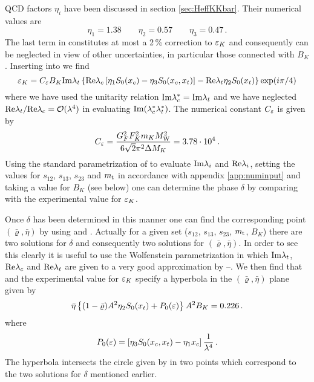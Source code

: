 QCD factors $\eta_i$ have been discussed in section
\ref{sec:HeffKKbar}. Their numerical values are
\begin{equation}
\eta_1 = 1.38 
\qquad
\eta_2 = 0.57
\qquad
\eta_3 = 0.47 \, .
\label{eq:etaknum}
\end{equation}
The last term in  constitutes at
most a 2\,\% correction to $\varepsilon_K$ and consequently can be neglected
in view of other uncertainties, in particular those connected with
$B_K$.  Inserting  into  we find
\begin{equation}
\varepsilon_K = C_{\varepsilon} B_K {\rm Im}\lambda_t \left\{
{\rm Re}\lambda_c \left[ \eta_1 S_0(x_c) - \eta_3 S_0(x_c, x_t) \right] -
{\rm Re}\lambda_t \eta_2 S_0(x_t) \right\} \exp(i \pi/4)
\label{eq:epsformula}
\end{equation}
where we have used the unitarity relation ${\rm Im}\lambda_c^* = {\rm
Im}\lambda_t$ and we have neglected ${\rm Re}\lambda_t/{\rm Re}\lambda_c
= {\cal O}(\lambda^4)$ in evaluating ${\rm Im}(\lambda_c^* \lambda_t^*)$.
The numerical constant $C_\varepsilon$ is given by
\begin{equation}
C_\varepsilon = \frac{G_F^2 F_K^2 m_K M_{\rm W}^2}{6 \sqrt{2} \pi^2 \Delta M_K}
       = 3.78 \cdot 10^4 \, .
\label{eq:Ceps}
\end{equation}
Using the standard parametrization of  to evaluate ${\rm
Im}\lambda_i$ and ${\rm Re}\lambda_i$, setting the values for $s_{12}$,
$s_{13}$, $s_{23}$ and $m_{\rm t}$ in accordance with appendix
\ref{app:numinput} and taking a value for $B_K$ (see below) one can
determine the phase $\delta$ by comparing  with the
experimental value for $\varepsilon_K$.

Once $\delta$ has been determined in this manner one can find the
corresponding point $(\bar\varrho,\bar\eta)$ by using  and
. Actually for a given set ($s_{12}$, $s_{13}$, $s_{23}$,
$m_{\rm t}$, $B_K$) there are two solutions for $\delta$ and consequently two
solutions for $(\bar\varrho,\bar\eta)$. In order to see this clearly it is
useful to use the Wolfenstein parametrization in which ${\rm
Im}\lambda_t$, ${\rm Re}\lambda_c$ and ${\rm Re}\lambda_t$ are given to
a very good approximation by --. We then find that
 and the experimental value for $\varepsilon_K$ specify a
hyperbola in the $(\bar\varrho,\bar\eta)$ plane given by
\begin{equation}
\bar\eta \left\{ (1 - \bar\varrho) A^2 \eta_2 S_0(x_t) + P_0(\varepsilon)
\right\} A^2 B_K = 0.226 \, .
\label{eq:hyperbola}
\end{equation}
where
\begin{equation}
P_0(\varepsilon) =
\left[ \eta_3 S_0(x_c, x_t) - \eta_1 x_c \right] \frac{1}{\lambda^4} \, .
\label{eq:p0eps}
\end{equation}
The hyperbola  intersects the circle given by
 in two points which correspond to the two solutions for
$\delta$ mentioned earlier.

